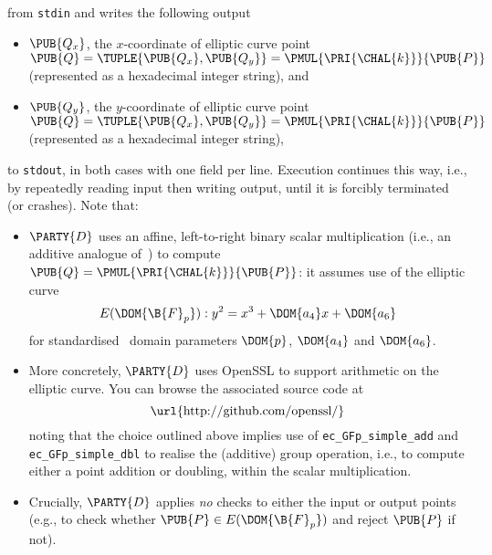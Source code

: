 \documentclass[crop={false},multi={true},tikz={true}]{standalone}
\begin{document}
\noindent
from \lstinline[language={bash}]{stdin} and writes the following output

\begin{itemize}
\item $\PUB{Q_x}$,
      the $x$-coordinate of elliptic curve point $\PUB{Q} = \TUPLE{ \PUB{Q_x}, \PUB{Q_y} } = \PMUL{\PRI{\CHAL{k}}}{\PUB{P}}$
      (represented as a                   hexadecimal integer string),
      and
\item $\PUB{Q_y}$,
      the $y$-coordinate of elliptic curve point $\PUB{Q} = \TUPLE{ \PUB{Q_x}, \PUB{Q_y} } = \PMUL{\PRI{\CHAL{k}}}{\PUB{P}}$
      (represented as a                   hexadecimal integer string),
\end{itemize}

\noindent
to \lstinline[language={bash}]{stdout}, in both cases with one field per 
line.  Execution continues this way, i.e., by repeatedly reading input 
then writing output, until it is forcibly terminated (or crashes).  
Note that:

\begin{itemize}
\item $\PARTY{D}$ uses an affine, left-to-right binary scalar multiplication
      (i.e., an additive analogue of~\cite[Section 2.1]{SCALE:Gordon:85}) to 
      compute $\PUB{Q} = \PMUL{\PRI{\CHAL{k}}}{\PUB{P}}$: it assumes use of 
      the
       elliptic curve
      \[
      E( \DOM{\B{F}_p} ) : y^2 = x^3 + \DOM{a_4} x + \DOM{a_6}
      \]
      for standardised~\cite{SCALE:FIPS:186:00} domain parameters $\DOM{p}$, 
      $\DOM{a_4}$ and $\DOM{a_6}$.
\item More concretely, $\PARTY{D}$ uses OpenSSL to support arithmetic on the
      elliptic curve.  You can browse the associated source code at
      \[
      \mbox{\url{http://github.com/openssl/}}
      \]
      noting that the choice outlined above implies use of 
      \lstinline[language={C}]{ec_GFp_simple_add}
      and
      \lstinline[language={C}]{ec_GFp_simple_dbl}
      to realise the (additive) group operation, i.e., to compute either a
      point addition or doubling, within the scalar multiplication.
\item Crucially, $\PARTY{D}$ applies {\em no} checks to either the input or
      output points (e.g., to check whether 
      $
      \PUB{P} \in E( \DOM{\B{F}_p} )
      $ 
      and reject $\PUB{P}$ if not).
\end{itemize}
\end{document}
